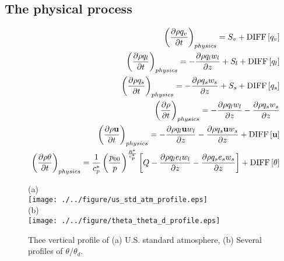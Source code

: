 \subsection{The physical process}
\begin{eqnarray}
&& \left( \frac{\partial \rho q_v}{\partial t} \right)_{physics}  = S_v
+{\rm DIFF}\left[q_v \right]
\label{eq:rho_v_p2}\\
&& \left( \frac{\partial \rho q_l}{\partial t} \right)_{physics}
= - \frac{\partial \rho q_l w_l}{\partial z}+S_l
+{\rm DIFF}\left[q_l \right]
\label{eq:rho_l_p2}\\
&& \left( \frac{\partial \rho q_s}{\partial t} \right)_{physics}
=- \frac{\partial \rho q_s w_s}{\partial z}+S_s
+{\rm DIFF}\left[q_s \right]
\label{eq:rho_s_p2}\\
&& \left( \frac{\partial \rho}{\partial t} \right)_{physics}
=- \frac{\partial \rho q_l w_l}{\partial z}
 - \frac{\partial \rho q_s w_s}{\partial z}
 \label{eq:rhotot_p2}\\
&& \left( \frac{\partial \rho {\bf u}}{\partial t} \right)_{physics}
=
- \frac{\partial \rho q_l {\bf u} w_l}{\partial z}
- \frac{\partial \rho q_s {\bf u} w_s}{\partial z}
+{\rm DIFF}\left[{\bf u} \right]
 \label{eq:momtot_p2}\\
&& \left( \frac{\partial \rho \theta  }{\partial t} \right)_{physics}
=  \frac{1}{c_p^*} \left(\frac{p_{00}}{p}\right)^{\frac{R^*}{c_p^*}}
\left[Q
 - \frac{\partial \rho q_l e_l w_l}{\partial z}
 - \frac{\partial \rho q_s e_s w_s}{\partial z}
\right]
 + {\rm DIFF}\left[\theta \right] \label{eq:etot_p2}
\end{eqnarray}

\begin{figure}[t]
  (a)\\
  \texttt{[image: ./../figure/us\_std\_atm\_profile.eps]}\\
  (b)\\
  \texttt{[image: ./../figure/theta\_theta\_d\_profile.eps]}\\
  \caption{Thee vertical profile of (a) U.S. standard atmosphere,
  (b) Several profiles of $\theta/\theta_d$.}
  \label{fig:fig1}
\end{figure}
